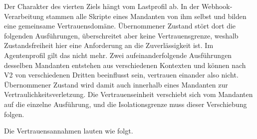 Der Charakter des vierten Ziels hängt vom Lastprofil ab. In
der Webhook-Verarbeitung stammen alle Skripte eines Mandanten von ihm selbst und bilden eine
gemeinsame Vertrauensdomäne. Übernommener Zustand stört dort die folgenden Ausführungen,
überschreitet aber keine Vertrauensgrenze, weshalb Zustandsfreiheit hier eine Anforderung an die
Zuverlässigkeit ist. Im Agentenprofil gilt das nicht mehr. Zwei aufeinanderfolgende Ausführungen
desselben Mandanten entstehen aus verschiedenen Kontexten und können nach V2 von verschiedenen
Dritten beeinflusst sein, vertrauen einander also nicht. Übernommener
Zustand wird damit auch innerhalb eines Mandanten zur Vertraulichkeitsverletzung. Die
Vertrauenseinheit verschiebt sich vom Mandanten auf die einzelne Ausführung, und die
Isolationsgrenze muss dieser Verschiebung folgen.

Die Vertrauensannahmen lauten wie folgt.

